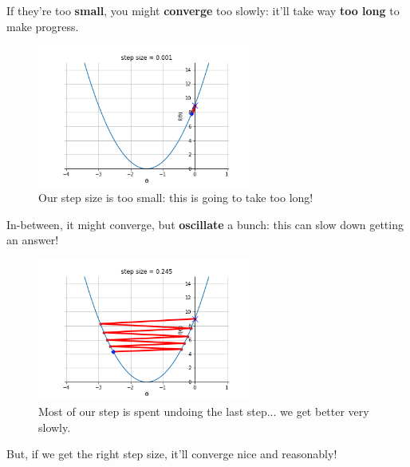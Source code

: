         If they're too \textbf{small}, you might \textbf{converge} too slowly: it'll take way \textbf{too long} to make progress.
        
        \begin{figure}[H]
        \centering
            \includegraphics[width=70mm,scale=0.5]{images/gradient_descent_images/converge_slowly.png}
        
        \caption*{Our step size is too small: this is going to take too long!}
        \end{figure}
        
        In-between, it might converge, but \textbf{oscillate} a bunch: this can slow down getting an answer!
        
        \begin{figure}[H]
        \centering
            \includegraphics[width=70mm,scale=0.5]{images/gradient_descent_images/oscillate.png}
        
        \caption*{Most of our step is spent undoing the last step... we get better very slowly.}
        \end{figure}
        
        But, if we get the right step size, it'll converge nice and reasonably!
        
